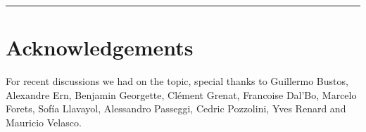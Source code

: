 \documentclass[11pt]{article}
\begin{document}

\vspace{0.5cm}
\hrule
\vspace{0.5cm}





\section{Acknowledgements}

For recent discussions we had on the topic,
special thanks to 
Guillermo Bustos,
Alexandre Ern,
Benjamin Georgette,
Cl\'ement Grenat,
Francoise Dal'Bo,
Marcelo Forets,
Sof\'ia Llavayol,
Alessandro Passeggi,
Cedric Pozzolini,
Yves Renard and
Mauricio Velasco.



\end{document}
